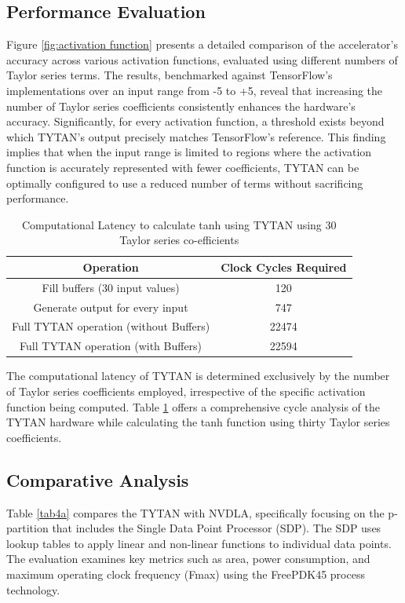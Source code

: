 \documentclass[conference,10pt]{IEEEtran}
\begin{document}
\subsection{Performance Evaluation}
    Figure \ref{fig:activation function} presents a detailed comparison of the accelerator's accuracy across various activation functions, evaluated using different numbers of Taylor series terms. The results, benchmarked against TensorFlow’s implementations over an input range from -5 to +5, reveal that increasing the number of Taylor series coefficients consistently enhances the hardware’s accuracy. Significantly, for every activation function, a threshold exists beyond which TYTAN’s output precisely matches TensorFlow’s reference. This finding implies that when the input range is limited to regions where the activation function is accurately represented with fewer coefficients, TYTAN can be optimally configured to use a reduced number of terms without sacrificing performance.

    \begin{table}[ht]
        \caption{Computational Latency to calculate tanh using TYTAN using 30 Taylor series co-efficients}
        \centering
        \begin{tabular}{|c|c|}
            \hline
            \textbf{Operation} & \textbf{Clock Cycles Required} \\ \hline
            Fill buffers (30 input values) & 120 \\ \hline
            Generate output for every input & 747 \\ \hline
            Full TYTAN operation (without Buffers) & 22474 \\ \hline
            Full TYTAN operation (with Buffers) & 22594 \\ \hline
        \end{tabular}
        \label{tab3}
    \end{table}
    
    The computational latency of TYTAN is determined exclusively by the number of Taylor series coefficients employed, irrespective of the specific activation function being computed. Table \ref{tab3} offers a comprehensive cycle analysis of the TYTAN hardware while calculating the tanh function using thirty Taylor series coefficients.

\subsection{Comparative Analysis}
    Table \ref{tab4a} compares the TYTAN with NVDLA, specifically focusing on the p-partition that includes the Single Data Point Processor (SDP). The SDP uses lookup tables to apply linear and non-linear functions to individual data points. The evaluation examines key metrics such as area, power consumption, and maximum operating clock frequency (Fmax) using the FreePDK45 process technology. 
    
\end{document}
